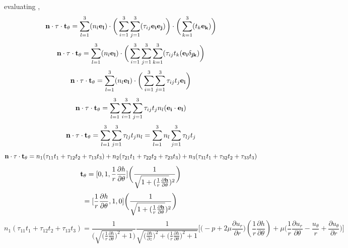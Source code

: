 \documentclass{article}
\begin{document}
{evaluating ,
\begin{equation}
{\bf n \cdot \tau \cdot t_{\theta}} = \sum_{l=1}^{3} (n_{l}{\bf e_{l}}) \cdot \bigg(\sum_{i=1}^{3}\sum_{j=1}^{3} (\tau_{ij}{\bf e_{i}e_{j}})\bigg)\cdot \bigg(\sum_{k=1}^{3} (t_{k}{\bf e_{k}})\bigg)  
\end{equation}
\begin{equation*}
{\bf {n \cdot \tau \cdot t_{\theta}}} = \sum_{l=1}^{3} (n_{l}{\bf e_{l}}) \cdot \bigg(\sum_{i=1}^{3}\sum_{j=1}^{3}\sum_{k=1}^{3} (\tau_{ij}  t_{k}({\bf e_{i}\delta_{jk}})\bigg)
\end{equation*}
\begin{equation*}
{\bf {n \cdot \tau \cdot t_{\theta}}} = \sum_{l=1}^{3} (n_{l}{\bf e_{l}}) \cdot \bigg(\sum_{i=1}^{3}\sum_{j=1}^{3} \tau_{ij}  t_{j}{\bf e_{i}}\bigg)
\end{equation*}
\begin{equation*}
{\bf {n \cdot \tau \cdot t_{\theta}}} = \sum_{l=1}^{3}\sum_{i=1}^{3}\sum_{j=1}^{3} \tau_{ij}t_{j}n_{l}({\bf e_{i} \cdot e_{l}})
\end{equation*}
\begin{equation*}
{\bf {n \cdot \tau \cdot t_{\theta}}} = \sum_{l=1}^{3}\sum_{j=1}^{3} \tau_{lj}t_{j}n_{l} = \sum_{l=1}^{3}n_{l}\sum_{j=1}^{3} \tau_{lj}t_{j}
\end{equation*}
\begin{equation}
{\bf {n \cdot \tau \cdot t_{\theta}}} = n_{1}(\tau_{11}t_{1} + \tau_{12}t_{2} + \tau_{13}t_{3}) +  n_{2}(\tau_{21}t_{1} + \tau_{22}t_{2} + \tau_{23}t_{3}) +  n_{3}(\tau_{31}t_{1} + \tau_{32}t_{2} + \tau_{33}t_{3}) 
\end{equation}
\begin{equation*}
{\bf t_{\theta }} = [{0 , 1 , \frac{1}{r}\frac{\partial h}{\partial \theta }}]\bigg(\frac{1}{\sqrt{1 + (\frac{1}{r}\frac{\partial {\bf h}}{\partial \theta }})^2}\bigg)
\end{equation*}
\begin{equation*}
[t_{1} ,t_{2}, t_{3}] = [{\frac{1}{r}\frac{\partial h}{\partial \theta }},1,0]\bigg(\frac{1}{\sqrt{1 + (\frac{1}{r}\frac{\partial {\bf h}}{\partial \theta }})^2}\bigg)
\end{equation*}
\begin{equation}
 n_{1}(\tau_{11}t_{1} + \tau_{12}t_{2} + \tau_{13}t_{3}) = \frac{1}{\bigg(\sqrt{\bigg(\frac{1}{r}\frac{\partial h}{\partial \theta}\bigg)^2 +  1}\bigg)}\frac{1}{\sqrt{\bigg(\frac{\partial h}{\partial z}\bigg)^2 + \bigg(\frac{1}{r}\frac{\partial h}{\partial \theta}\bigg)^2 + 1}}\bigg[\bigg(-p + 2\mu \frac{\partial u_{r}}{\partial r}\bigg)(\frac{1}{r}\frac{\partial h}{\partial \theta}) + \mu \bigg(\frac{1}{r}\frac{\partial u_{r}}{\partial \theta} -\frac{u_{\theta}}{r}+\frac{\partial u_{\theta}}{\partial r}\bigg)\bigg]

\end{equation}}
\end{document}

